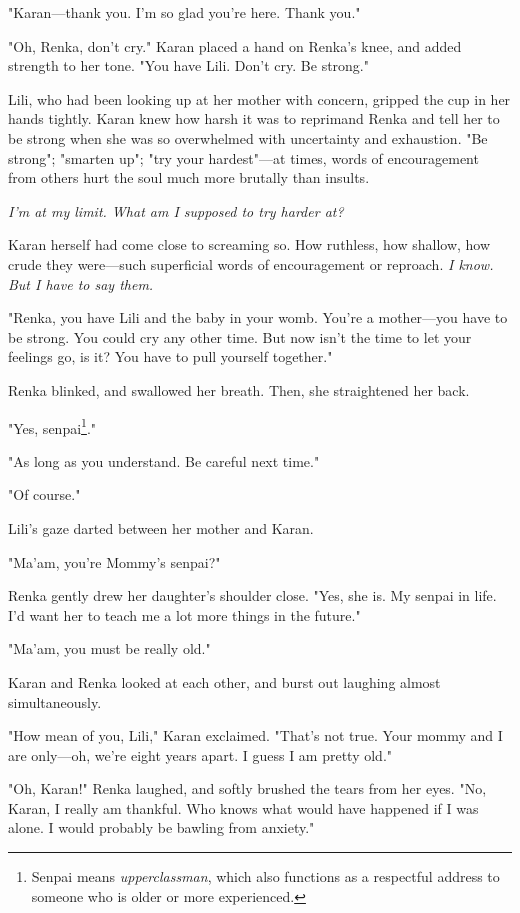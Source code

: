 "Karan---thank you. I'm so glad you're here. Thank you."

"Oh, Renka, don't cry." Karan placed a hand on Renka's knee, and added
strength to her tone. "You have Lili. Don't cry. Be strong."

Lili, who had been looking up at her mother with concern, gripped the
cup in her hands tightly. Karan knew how harsh it was to reprimand Renka
and tell her to be strong when she was so overwhelmed with uncertainty
and exhaustion. "Be strong"; "smarten up"; "try your hardest"---at times,
words of encouragement from others hurt the soul much more brutally than
insults.

\emph{I'm at my limit. What am I supposed to try harder at?}

Karan herself had come close to screaming so. How ruthless, how shallow,
how crude they were---such superficial words of encouragement or reproach.
\emph{I know. But I have to say them.}

"Renka, you have Lili and the baby in your womb. You're a mother---you
have to be strong. You could cry any other time. But now isn't the time
to let your feelings go, is it? You have to pull yourself together."

Renka blinked, and swallowed her breath. Then, she straightened her
back.

"Yes, senpai\footnote{Senpai means \emph{upperclassman}, which also functions as a respectful address to someone who is older or more experienced.}."

"As long as you understand. Be careful next time."

"Of course."

Lili's gaze darted between her mother and Karan.

"Ma'am, you're Mommy's senpai?"

Renka gently drew her daughter's shoulder close. "Yes, she is. My senpai
in life. I'd want her to teach me a lot more things in the future."

"Ma'am, you must be really old."

Karan and Renka looked at each other, and burst out laughing almost
simultaneously.

"How mean of you, Lili," Karan exclaimed. "That's not true. Your mommy
and I are only---oh, we're eight years apart. I guess I am pretty old."

"Oh, Karan!" Renka laughed, and softly brushed the tears from her eyes.
"No, Karan, I really am thankful. Who knows what would have happened if
I was alone. I would probably be bawling from anxiety."

